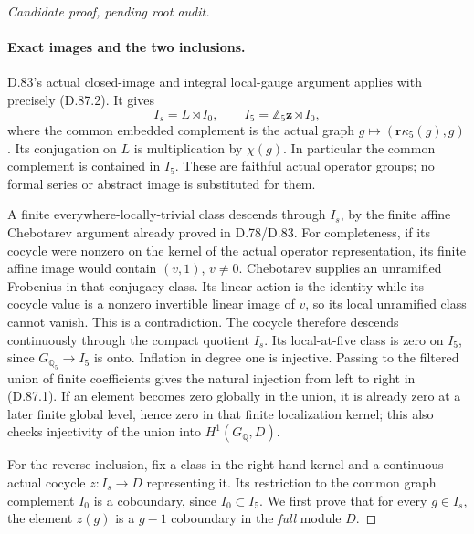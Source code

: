 \begin{proof}[Candidate proof, pending root audit]
\paragraph{Exact images and the two inclusions.}
D.83's actual closed-image and integral local-gauge argument
applies with precisely (D.87.2). It gives
\[
 I_s=L\rtimes I_0,\qquad
 I_5=\mathbb Z_5\mathbf z\rtimes I_0,                 \tag{D.87.5}
\]
where the common embedded complement is the actual graph
\(g\mapsto(\mathbf r\kappa_5(g),g)\). Its conjugation on
\(L\) is multiplication by \(\chi(g)\).
In particular the common complement is contained in \(I_5\).
These are faithful actual operator groups; no formal series
or abstract image is substituted for them.

A finite everywhere-locally-trivial class descends through
\(I_s\), by the finite affine Chebotarev argument already
proved in D.78/D.83. For completeness, if its cocycle were
nonzero on the kernel of the actual operator representation,
its finite affine image would contain \((v,1)\), \(v\ne0\).
Chebotarev supplies an unramified Frobenius in that conjugacy
class. Its linear action is the identity while its cocycle
value is a nonzero invertible linear image of \(v\), so its
local unramified class cannot vanish. This is a contradiction.
The cocycle therefore descends continuously through the compact
quotient \(I_s\). Its local-at-five class is zero on \(I_5\),
since \(G_{\mathbb Q_5}\to I_5\) is onto.
Inflation in degree one is injective. Passing to the filtered
union of finite coefficients gives the natural injection from
left to right in (D.87.1). If an element becomes zero globally
in the union, it is already zero at a later finite global
level, hence zero in that finite localization kernel; this
also checks injectivity of the union into \(H^1(G_{\mathbb Q},D)\).

For the reverse inclusion, fix a class in the right-hand kernel
and a continuous actual cocycle \(z:I_s\to D\) representing
it. Its restriction to the common graph complement \(I_0\)
is a coboundary, since \(I_0\subset I_5\). We first prove
that for every \(g\in I_s\), the element \(z(g)\) is a
\(g-1\) coboundary in the \emph{full} module \(D\).


\end{proof}

